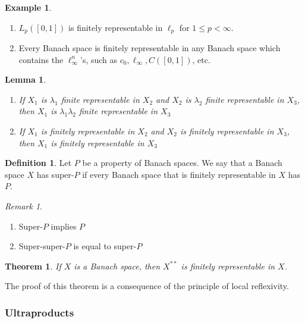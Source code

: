 \documentclass[11pt, reqno]{article}
\theoremstyle{plain}
\newtheorem*{theorem}{Theorem}
\newtheorem*{lemma}{Lemma}
\theoremstyle{definition}
\newtheorem*{definition}{Definition}
\newtheorem*{example}{Example}
\theoremstyle{remark}
\newtheorem*{remark}{Remark}
\begin{document}
\begin{example}
    \begin{enumerate}
        \item $L_p([0,1])$ is finitely representable in $\ell_p$ for $1 \leq p < \infty$.
        \item Every Banach space is finitely representable in any Banach space which contains 
        the $\ell_\infty^n$'s, such as $c_0, \ell_\infty, C([0,1])$, etc.
    \end{enumerate}
\end{example}

\begin{lemma}
    \begin{enumerate}
        \item If $X_1$ is $\lambda_1$ finite representable in $X_2$ and $X_2$ is $\lambda_2$ finite 
        representable in $X_3$, then $X_1$ is $\lambda_1 \lambda_2$ finite representable in $X_3$
        
        \item If $X_1$ is finitely representable in $X_2$ and $X_2$ is finitely representable 
        in $X_3$, then $X_1$ is finitely representable in $X_3$
    \end{enumerate}
\end{lemma}

\begin{definition}
    Let $P$ be a property of Banach spaces. We say that a Banach space $X$ has super-$P$ if 
    every Banach space that is finitely representable in $X$ has $P$.
\end{definition}

\begin{remark}
    \begin{enumerate}
        \item Super-$P$ implies $P$
        \item Super-super-$P$ is equal to super-$P$
    \end{enumerate}
\end{remark}

\begin{theorem}
    If $X$ is a Banach space, then $X^{**}$ is finitely representable in $X$.
\end{theorem}

The proof of this theorem is a consequence of the principle of local reflexivity.

\subsubsection*{Ultraproducts}
\end{document}
